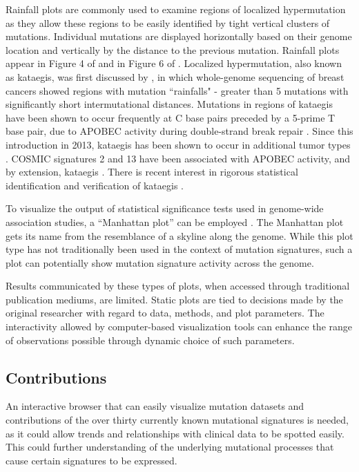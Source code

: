 \documentclass[12pt, letterpaper]{article}
\begin{document}
Rainfall plots are commonly used to examine regions of localized hypermutation as they allow these regions to be easily identified by tight vertical clusters of mutations. 
Individual mutations are displayed horizontally based on their genome location and vertically by the distance to the previous mutation.
Rainfall plots appear in Figure 4 of \citet{nik2012mutational} and in Figure 6 of \citet{alexandrov2013signatures}.
Localized hypermutation, also known as kataegis, was first discussed by \citet{taylor2013dna}, in which whole-genome sequencing of breast cancers showed regions with mutation ``rainfalls" - greater than 5 mutations with significantly short intermutational distances. Mutations in regions of kataegis have been shown to occur frequently at C base pairs preceded by a 5-prime T base pair, due to APOBEC activity during double-strand break repair \citep{taylor2013dna,alexandrov2013signatures}. Since this introduction in 2013, kataegis has been shown to occur in additional tumor types \citep{alexandrov2013signatures}. COSMIC signatures 2 and 13 have been associated with APOBEC activity, and by extension, kataegis \citep{alexandrov2013signatures}. There is recent interest in rigorous statistical identification and verification of kataegis \citep{yousif2018origins}.

To visualize the output of statistical significance tests used in genome-wide association studies, a ``Manhattan plot'' can be employed \citep{gibson2010hints}.
The Manhattan plot gets its name from the resemblance of a skyline along the genome.
While this plot type has not traditionally been used in the context of mutation signatures, such a plot can potentially show mutation signature activity across the genome.

Results communicated by these types of plots, when accessed through traditional publication mediums, are limited.
Static plots are tied to decisions made by the original researcher with regard to data, methods, and plot parameters.
The interactivity allowed by computer-based visualization tools can enhance the range of observations possible through dynamic choice of such parameters.

\subsection{Contributions}
An interactive browser that can easily visualize mutation datasets and contributions of the over thirty currently known mutational signatures is needed, as it could allow trends and relationships with clinical data to be spotted easily.
This could further understanding of the underlying mutational processes that cause certain signatures to be expressed.
\end{document}
